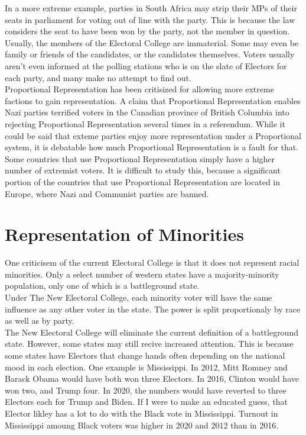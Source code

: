 \documentclass{article}
\begin{document}
    In a more extreme example, parties in South Africa may strip their MPs of their seats in parliament for voting out of line with the party. This is because the law considers the seat to have been won by the party, not the member in question.\\

    Usually, the members of the Electoral College are immaterial. Some may even be family or friends of the candidates, or the candidates themselves. Voters usually aren't even informed at the polling stations who is on the slate of Electors for each party, and many make no attempt to find out.\\

    Proportional Representation has been critisized for allowing more extreme factions to gain representation. A claim that Proportional Representation enables Nazi parties terrified voters in the Canadian province of British Columbia into rejecting Proportional Representation several times in a referendum. While it could be said that exteme parties enjoy more representation under a Proportional system, it is debatable how much Proportional Representation is a fault for that. Some countries that use Proportional Representation simply have a higher number of extremist voters. It is difficult to study this, because a significant portion of the countries that use Proportional Representation are located in Europe, where Nazi and Communist parties are banned.\\

    \section{Representation of Minorities}%

    One criticisem of the current Electoral College is that it does not represent racial minorities. Only a select number of western states have a majority-minority population, only one of which is a battleground state.\\

    Under The New Electoral College, each minority voter will have the same influence as any other voter in the state. The power is split proportionaly by race as well as by party.\\

    The New Electoral College will eliminate the current definition of a battleground state. However, some states may still recive increased attention. This is because some states have Electors that change hands often depending on the national mood in each election. One example is Mississippi. In 2012, Mitt Romney and Barack Obama would have both won three Electors. In 2016, Clinton would have won two, and Trump four. In 2020, the numbers would have reverted to three Electors each for Trump and Biden. If I were to make an educated guess, that Elector likley has a lot to do with the Black vote in Mississippi. Turnout in Mississippi amoung Black voters was higher in 2020 and 2012 than in 2016.\\
\end{document}
